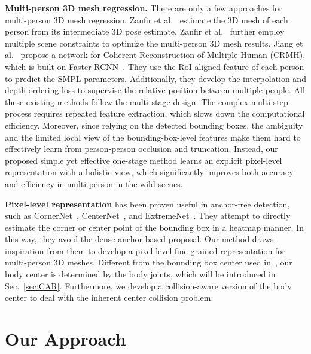 \documentclass[10pt,twocolumn,letterpaper]{article}
\begin{document}
\textbf{Multi-person 3D mesh regression.} 
There are only a few approaches for multi-person 3D mesh regression.  Zanfir et al.~\cite{zanfir2018deep} estimate the 3D mesh of each person from its intermediate 3D pose estimate.
Zanfir et al.~\cite{zanfir2018monocular} further employ multiple scene constraints to optimize the multi-person 3D mesh results. 
Jiang et al.~\cite{jiang2020coherent} propose a network for Coherent Reconstruction of Multiple Human (CRMH), which is built on Faster-RCNN~\cite{ren2015fasterrcnn}. 
They use the RoI-aligned feature of each person to predict the SMPL parameters. 
Additionally, they develop the interpolation and depth ordering loss to supervise the relative position between multiple people.
All these existing methods follow the multi-stage design.
The complex multi-step process requires repeated feature extraction, which slows down the computational efficiency. 
Moreover, since relying on the detected bounding boxes, the ambiguity and the limited local view of the bounding-box-level features make them hard to effectively learn from person-person occlusion and truncation.
Instead, our proposed simple yet effective one-stage method learns an explicit pixel-level representation with a holistic view, which significantly improves both accuracy and efficiency in multi-person in-the-wild scenes. 
    
 \textbf{Pixel-level representation} has been proven useful in anchor-free detection, such as CornerNet~\cite{law2018cornernet}, CenterNet~\cite{duan2019centernet,zhou2019objects}, and ExtremeNet~\cite{ExtremeNet}.
They attempt to directly estimate the corner or center point of the bounding box in a heatmap manner.
In this way, they avoid the dense anchor-based proposal.
Our method draws inspiration from them to develop a pixel-level fine-grained representation for multi-person 3D meshes.
Different from the bounding box center used in~\cite{zhou2019objects}, our body center is determined by the body joints, which will be introduced in Sec.~\ref{sec:CAR}. 
Furthermore, we develop a collision-aware version of the body center to deal with the inherent center collision problem. 

\vspace{-2mm}
\section{Our Approach}
\vspace{-1mm}
\end{document}
